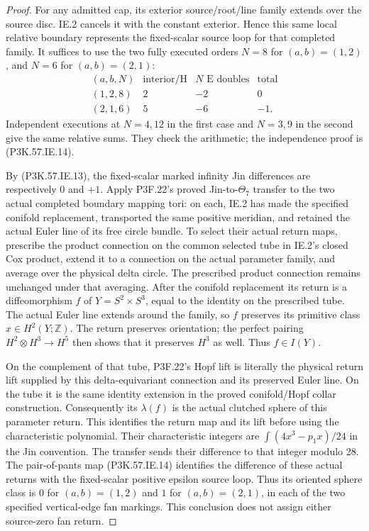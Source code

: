 \begin{proof}
For any admitted cap, its exterior
source/root/line family extends over
the source disc. IE.2 cancels it with
the constant exterior. Hence this
same local relative boundary represents
the fixed-scalar source loop for that
completed family. It suffices to use
the two fully executed orders \(N=8\)
for \((a,b)=(1,2)\), and \(N=6\) for
\((a,b)=(2,1)\):
\[
 \begin{array}{c|rrr}
 (a,b,N)&\text{interior/H}&N\text{ E doubles}&\text{total}\\ \hline
 (1,2,8)&2&-2&0\\
 (2,1,6)&5&-6&-1 .
 \end{array}                                           \tag{P3K.57.IE.15}
\]
Independent executions at \(N=4,12\)
in the first case and \(N=3,9\) in
the second give the same relative
sums. They check the arithmetic;
the independence proof is (P3K.57.IE.14).

By (P3K.57.IE.13), the fixed-scalar marked infinity
Jin differences are respectively \(0\) and \(+1\).
Apply P3F.22's proved Jin-to-\(\Theta_7\) transfer
to the two actual completed boundary mapping
tori: on each, IE.2 has made the specified conifold
replacement, transported the same positive meridian,
and retained the actual Euler line of its free circle
bundle. To select their actual return maps, prescribe
the product connection on the common selected tube
in IE.2's closed Cox product, extend it to a connection
on the actual parameter family, and average over
the physical delta circle. The prescribed product
connection remains unchanged under that averaging.
After the conifold replacement its return is a
diffeomorphism \(f\) of \(Y=S^2\times S^3\), equal
to the identity on the prescribed tube. The actual
Euler line extends around the family, so \(f\)
preserves its primitive class \(x\in H^2(Y;\mathbb Z)\).
The return preserves orientation; the perfect
pairing \(H^2\otimes H^3\to H^5\) then shows that
it preserves \(H^3\) as well. Thus \(f\in I(Y)\).

On the complement of that tube, P3F.22's Hopf lift
is literally the physical return lift supplied by
this delta-equivariant connection and its preserved
Euler line. On the tube it is the same identity
extension in the proved conifold/Hopf collar
construction. Consequently its \(\lambda(f)\) is
the actual clutched sphere of this parameter return.
This identifies the return map and its lift before
using the characteristic polynomial. Their
characteristic integers are
\(\int(4x^3-p_1x)/24\) in the Jin convention.
The transfer sends their difference to that integer
modulo 28. The pair-of-pants map (P3K.57.IE.14) identifies
the difference of these actual returns with the
fixed-scalar positive epsilon source loop. Thus
its oriented sphere class is \(0\) for \((a,b)=(1,2)\)
and \(1\) for \((a,b)=(2,1)\), in each of the two
specified vertical-edge fan markings. This conclusion
does not assign either source-zero fan return.


\end{proof}
